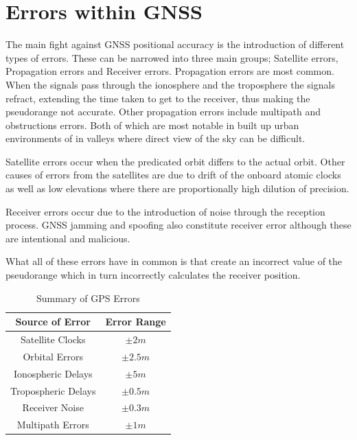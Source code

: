 \section{Errors within GNSS}
The main fight against GNSS positional accuracy is the introduction of different types of errors. These can be narrowed into three main groups; Satellite errors,
Propagation errors and Receiver errors. Propagation errors are most common. When the signals pass through the ionosphere and the troposphere the signals refract, extending
the time taken to get to the receiver, thus making the pseudorange not accurate. Other propagation errors include multipath and obstructions errors. Both of which are
most notable in built up urban environments of in valleys where direct view of the sky can be difficult.

Satellite errors occur when the predicated orbit differs to the actual orbit. Other causes of errors from the satellites are due to drift of the onboard atomic clocks as
well as low elevations where there are proportionally high dilution of precision.

Receiver errors occur due to the introduction of noise through the reception process. GNSS jamming and spoofing also constitute receiver error although these are
intentional and malicious.

What all of these errors have in common is that create an incorrect value of the pseudorange which in turn incorrectly calculates the receiver position.

\renewcommand{\arraystretch}{1.5}
\begin{table}
    \begin{center}
        \caption{Summary of GPS Errors}
        \label{tab:GPS Errors}
        \begin{tabular}{ c|c }
            \hline
            \textbf{Source of Error} & \textbf{Error Range} \\
            \hline
            Satellite Clocks & $\pm 2m$\\
            Orbital Errors & $\pm 2.5m$\\
            Ionospheric Delays & $\pm 5m$\\
            Tropospheric Delays & $\pm 0.5m$\\
            Receiver Noise & $\pm 0.3m$\\
            Multipath Errors & $\pm 1m$\\
            \hline
        \end{tabular}
    \end{center}
\end{table}
\renewcommand{\arraystretch}{1}

